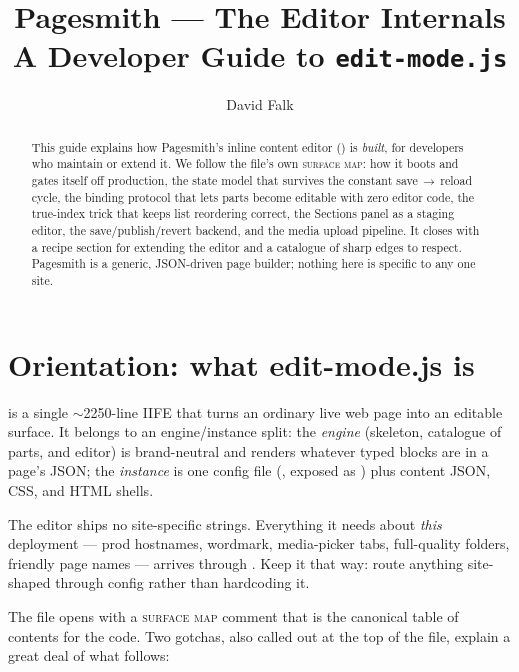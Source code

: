 \documentclass[11pt]{article}
\title{Pagesmith --- The Editor Internals\\[2pt]\large A Developer Guide to \texttt{edit-mode.js}}
\author{David Falk}
\date{}
\begin{document}
\maketitle

\begin{abstract}
\noindent This guide explains how Pagesmith's inline content editor
() is \emph{built}, for developers who maintain or extend it.
We follow the file's own \textsc{surface map}: how it boots and gates itself off
production, the state model that survives the constant save\,$\to$\,reload cycle,
the  binding protocol that lets parts become editable with zero
editor code, the true-index trick that keeps list reordering correct, the
Sections panel as a staging editor, the save/publish/revert backend, and the
media upload pipeline. It closes with a recipe section for extending the editor
and a catalogue of sharp edges to respect. Pagesmith is a generic, JSON-driven
page builder; nothing here is specific to any one site.
\end{abstract}

\tableofcontents
\bigskip

\section{Orientation: what edit-mode.js is}

 is a single $\sim$2250-line IIFE that turns an ordinary live
web page into an editable surface. It belongs to an engine/instance split: the
\emph{engine} (skeleton, catalogue of parts, and editor) is brand-neutral and
renders whatever typed blocks are in a page's JSON; the \emph{instance} is one
config file (, exposed as ) plus content
JSON, CSS, and HTML shells.

The editor ships no site-specific strings. Everything it needs about \emph{this}
deployment --- prod hostnames, wordmark, media-picker tabs, full-quality folders,
friendly page names --- arrives through . Keep it that way:
route anything site-shaped through config rather than hardcoding it.

The file opens with a \textsc{surface map} comment that is the canonical table of
contents for the code. Two gotchas, also called out at the top of the file,
explain a great deal of what follows:
\end{document}
